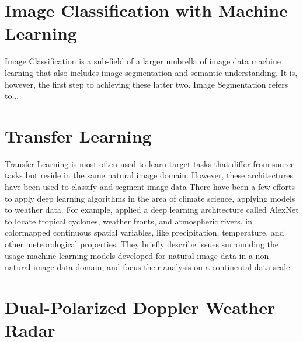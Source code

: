 \section{Image Classification with Machine Learning}
\label{sec:background_imageclassification}

Image Classification is a sub-field of a larger umbrella of image data machine learning that also includes image segmentation and semantic understanding. It is, however, the first step to achieving these latter two. Image Segmentation refers to...


\section{Transfer Learning}
\label{sec:background_transferlearning}

Transfer Learning is most often used to learn target tasks that differ from source tasks but reside in the same natural image domain. However, these architectures have been used to classify and segment image data
There have been a few efforts to apply deep learning algorithms in the area of climate science, applying models to weather data. 
For example, \cite{liu2016application} applied a deep learning architecture called AlexNet \cite{krizhevsky2012imagenet} to locate tropical cyclones, weather fronts, and atmospheric rivers, in colormapped continuous spatial variables, like precipitation, temperature, and other meteorological properties.
They briefly describe issues surrounding the usage machine learning models developed for natural image data in a non-natural-image data domain, and focus their analysis on a continental data scale.


\section{Dual-Polarized Doppler Weather Radar}
\label{sec:background_dualpol}

